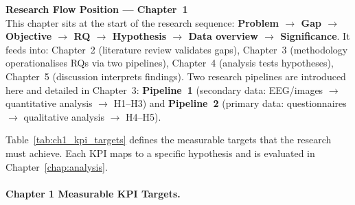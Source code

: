 \medskip
\noindent
\small\textbf{Research Flow Position --- Chapter~1}\\[3pt]
This chapter sits at the start of the research sequence: \textbf{Problem $\to$ Gap $\to$ Objective $\to$ RQ $\to$ Hypothesis $\to$ Data overview $\to$ Significance}.
It feeds into: Chapter~2 (literature review validates gaps), Chapter~3 (methodology operationalises RQs via two pipelines), Chapter~4 (analysis tests hypotheses), Chapter~5 (discussion interprets findings).
Two research pipelines are introduced here and detailed in Chapter~3:
\textbf{Pipeline~1} (secondary data: EEG/images $\to$ quantitative analysis $\to$ H1--H3) and
\textbf{Pipeline~2} (primary data: questionnaires $\to$ qualitative analysis $\to$ H4--H5).


\vspace{0.5em}

\noindent Table~\ref{tab:ch1_kpi_targets} defines the measurable targets that the research must achieve. Each KPI maps to a specific hypothesis and is evaluated in Chapter~\ref{chap:analysis}.

\paragraph{Chapter 1 Measurable KPI Targets.}







